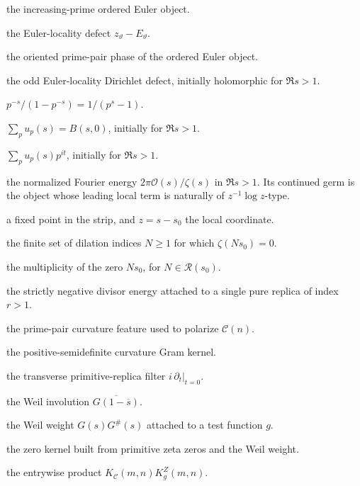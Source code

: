 \documentclass[11pt]{amsart}
\numberwithin{equation}{section}
\theoremstyle{plain}
\theoremstyle{definition}
\theoremstyle{remark}
\begin{document}
\begin{description}[leftmargin=3.2cm,style=nextline]
\item[\(E_\vartheta\)] the increasing-prime ordered Euler object.
\item[\(R_\vartheta\)] the Euler-locality defect \(z_\vartheta-E_\vartheta\).
\item[\(\Phi_{\rm ord}(n)\)] the oriented prime-pair phase of the ordered
Euler object.
\item[\(\mathcal O(s)\)] the odd Euler-locality Dirichlet defect, initially
holomorphic for \(\Re s>1\).
\item[\(u_p(s)\)] \(p^{-s}/(1-p^{-s})=1/(p^s-1)\).
\item[\(A(s)\)] \(\sum_pu_p(s)=B(s,0)\), initially for \(\Re s>1\).
\item[\(B(s,t)\)] \(\sum_pu_p(s)p^{it}\), initially for \(\Re s>1\).
\item[\(\mathcal I(s)\)] the normalized Fourier energy
\(2\pi\mathcal O(s)/\zeta(s)\) in \(\Re s>1\).  Its continued germ is the
object whose leading local term is naturally of
\(z^{-1}\log z\)-type.
\item[\(s_0\)] a fixed point in the strip, and \(z=s-s_0\) the local
coordinate.
\item[\(\mathcal R(s_0)\)] the finite set of dilation indices
\(N\ge1\) for which \(\zeta(Ns_0)=0\).
\item[\(q_N\)] the multiplicity of the zero \(Ns_0\), for
\(N\in\mathcal R(s_0)\).
\item[\(\beta_r\)] the strictly negative divisor energy attached to a
single pure replica of index \(r>1\).
\item[\(\Phi_{pq}(n)\)] the prime-pair curvature feature used to polarize \(\mathcal C(n)\).
\item[\(K_{\mathcal C}(m,n)\)] the positive-semidefinite curvature Gram kernel.
\item[\(\Pi\)] the transverse primitive-replica filter \(i\,\partial_t|_{t=0}\).
\item[\(G^\#(s)\)] the Weil involution \(\overline{G(1-\overline{s})}\).
\item[\(W_g(s)\)] the Weil weight \(G(s)G^\#(s)\) attached to a test function \(g\).
\item[\(K_g^Z(m,n)\)] the zero kernel built from primitive zeta zeros and the Weil weight.
\item[\(\mathscr K_g(m,n)\)] the entrywise product \(K_{\mathcal C}(m,n)K_g^Z(m,n)\).
\end{description}
\end{document}
